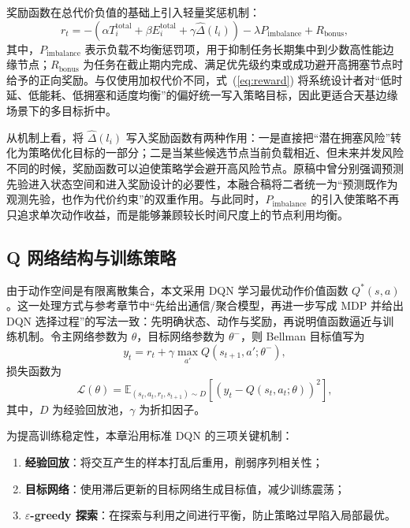 奖励函数在总代价负值的基础上引入轻量奖惩机制：
\begin{equation}
r_t = -\left(
\alpha T_i^{\mathrm{total}}
+ \beta E_i^{\mathrm{total}}
+ \gamma \widehat{\Delta}(l_i)
\right)
- \lambda P_{\mathrm{imbalance}}
+ R_{\mathrm{bonus}},
\label{eq:reward}
\end{equation}
其中，$P_{\mathrm{imbalance}}$ 表示负载不均衡惩罚项，用于抑制任务长期集中到少数高性能边缘节点；$R_{\mathrm{bonus}}$ 为任务在截止期内完成、满足优先级约束或成功避开高拥塞节点时给予的正向奖励。与仅使用加权代价不同，式~(\ref{eq:reward}) 将系统设计者对“低时延、低能耗、低拥塞和适度均衡”的偏好统一写入策略目标，因此更适合天基边缘场景下的多目标折中。

从机制上看，将 $\widehat{\Delta}(l_i)$ 写入奖励函数有两种作用：一是直接把“潜在拥塞风险”转化为策略优化目标的一部分；二是当某些候选节点当前负载相近、但未来并发风险不同的时候，奖励函数可以迫使策略学会避开高风险节点。原稿中曾分别强调预测先验进入状态空间和进入奖励设计的必要性，本融合稿将二者统一为“预测既作为观测先验，也作为代价约束”的双重作用。与此同时，$P_{\mathrm{imbalance}}$ 的引入使策略不再只追求单次动作收益，而是能够兼顾较长时间尺度上的节点利用均衡。

\subsection{Q 网络结构与训练策略}

由于动作空间是有限离散集合，本文采用 DQN 学习最优动作价值函数 $Q^*(s,a)$。这一处理方式与参考章节中“先给出通信/聚合模型，再进一步写成 MDP 并给出 DQN 选择过程”的写法一致：先明确状态、动作与奖励，再说明值函数逼近与训练机制。令主网络参数为 $\theta$，目标网络参数为 $\theta^{-}$，则 Bellman 目标值写为
\begin{equation}
y_t =
r_t + \gamma \max_{a'} Q(s_{t+1},a';\theta^-),
\label{eq:bellman_target}
\end{equation}
损失函数为
\begin{equation}
\mathcal{L}(\theta) =
\mathbb{E}_{(s_t,a_t,r_t,s_{t+1}) \sim D}
\left[
\left(
y_t - Q(s_t,a_t;\theta)
\right)^2
\right],
\label{eq:dqn_loss}
\end{equation}
其中，$D$ 为经验回放池，$\gamma$ 为折扣因子。

为提高训练稳定性，本章沿用标准 DQN 的三项关键机制：

\begin{enumerate}[label=\arabic*)]
    \item \textbf{经验回放}：将交互产生的样本打乱后重用，削弱序列相关性；
    \item \textbf{目标网络}：使用滞后更新的目标网络生成目标值，减少训练震荡；
    \item \textbf{$\varepsilon$-greedy 探索}：在探索与利用之间进行平衡，防止策略过早陷入局部最优。
\end{enumerate}

